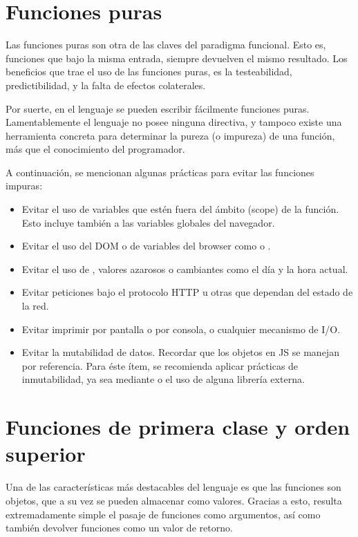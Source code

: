 \section{Funciones puras}

Las funciones puras son otra de las claves del paradigma funcional. Esto es, funciones que bajo la misma entrada, siempre devuelven el mismo resultado. Los beneficios que trae el uso de las funciones puras, es la testeabilidad, predictibilidad, y la falta de efectos colaterales.

Por suerte, en el lenguaje se pueden escribir fácilmente funciones puras. Lamentablemente el lenguaje no posee ninguna directiva, y tampoco existe una herramienta concreta para determinar la pureza (o impureza) de una función, más que el conocimiento del programador.

A continuación, se mencionan algunas prácticas para evitar las funciones impuras:

\begin{itemize}
  \item Evitar el uso de variables que estén fuera del ámbito (scope) de la función. Esto incluye también a las variables globales del navegador.
  \item Evitar el uso del DOM o de variables del browser como  o .
	\item Evitar el uso de , valores azarosos o cambiantes como el día y la hora actual.
	\item Evitar peticiones bajo el protocolo HTTP u otras que dependan del estado de la red.
	\item Evitar imprimir por pantalla o por consola, o cualquier mecanismo de I/O.
	\item Evitar la mutabilidad de datos. Recordar que los objetos en JS se manejan por referencia. Para éste ítem, se recomienda aplicar prácticas de inmutabilidad, ya sea mediante  o el uso de alguna librería externa.
\end{itemize}

\section{Funciones de primera clase y orden superior}

Una de las características más destacables del lenguaje es que las funciones son objetos, que a su vez se pueden almacenar como valores. Gracias a esto, resulta extremadamente simple el pasaje de funciones como argumentos, así como también devolver funciones como un valor de retorno.

